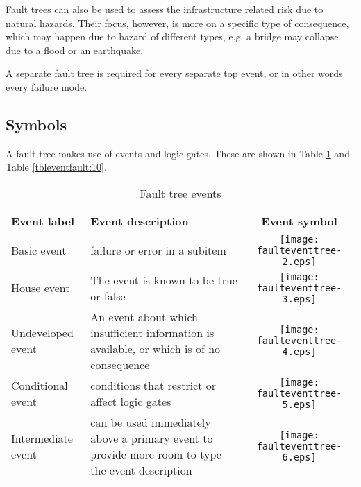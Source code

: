 Fault trees can also be used to assess the infrastructure related risk due to
natural hazards. Their focus, however, is more on a specific type of consequence,
which may happen due to hazard of different types, e.g. a bridge may collapse due
to a flood or an earthquake.

A separate fault tree is required for every separate top event, or in other
words every failure mode.
\subsection{Symbols}
A fault tree makes use of events and logic gates. These are shown in Table
\ref{tbleventfault:9} and Table \ref{tbleventfault:10}.
\begin{table}
\centering
\caption{Fault tree events} \label{tbleventfault:9}
\begin{tabular}{|>{\centering\arraybackslash}m{2cm}|>{\raggedright\arraybackslash}m{3.5cm}|c|}
\hline
Event label & Event description & Event symbol \\ 
\hline
Basic event & failure or error in a subitem & \texttt{[image: faulteventtree-2.eps]} \\ 
\hline
House event & The event is known to be true or false & \texttt{[image: faulteventtree-3.eps]} \\ 
\hline
Undeveloped event & An event about which insufficient information is available, or which is of no consequence & \texttt{[image: faulteventtree-4.eps]} \\ 
\hline
Conditional event & conditions that restrict or affect logic gates & \texttt{[image: faulteventtree-5.eps]} \\ 
\hline
Intermediate event & can be used immediately above a primary event to provide more room to type the event description & \texttt{[image: faulteventtree-6.eps]} \\ 
\hline
\end{tabular}
\end{table}


